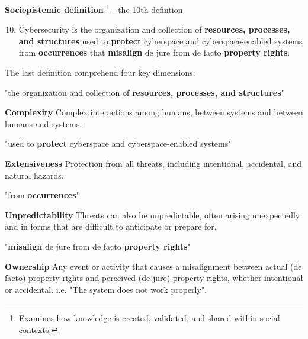 \textbf{Sociepistemic definition} \footnote{Examines how knowledge is created, validated, and shared within social contexts.} - the 10th defintion
\begin{enumerate}
    \setcounter{enumi}{9}
    \item Cybersecurity is the organization and collection of \textbf{resources, processes, and structures} used to \textbf{protect} cyberspace and cyberspace-enabled systems from \textbf{occurrences} that \textbf{misalign} de jure from de facto \textbf{property rights}.
\end{enumerate}
The last definition comprehend four key dimensions:
\begin{multicols}{2}
    \centering "the organization and collection of \textbf{resources, processes, and structures}"

    \columnbreak

    \textbf{Complexity}
        \newline Complex interactions among humans, between systems and between humans and systems.

\end{multicols}
    

\begin{multicols}{2}
    \centering "used to \textbf{protect} cyberspace and cyberspace-enabled systems"

    \columnbreak

    \textbf{Extensiveness}
        \newline Protection from all threats, including intentional, accidental, and natural hazards.

\end{multicols}

\begin{multicols}{2}
    \centering "from \textbf{occurrences}"

    \columnbreak

    \textbf{Unpredictability}
        \newline Threats can also be unpredictable, often arising unexpectedly and in forms that are difficult to anticipate or prepare for.

\end{multicols}



\begin{multicols}{2}
    \centering "\textbf{misalign} de jure from de facto \textbf{property rights}"

    \columnbreak

    \textbf{Ownership}
        \newline Any event or activity that causes a misalignment between actual (de facto) property rights and perceived (de jure) property rights, whether intentional or accidental. i.e. "The system does not work properly".

\end{multicols}

